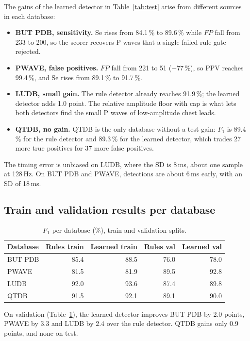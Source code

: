 \documentclass[11pt,a4paper]{article}
\begin{document}
The gains of the learned detector in Table~\ref{tab:test} arise from different sources in each database:
\begin{itemize}
\item \textbf{BUT PDB, sensitivity.} Se rises from 84.1\,\% to 89.6\,\% while $FP$ fall from 233 to 200, so the scorer recovers P waves that a single failed rule gate rejected.
\item \textbf{PWAVE, false positives.} $FP$ fall from 221 to 51 ($-77$\,\%), so PPV reaches 99.4\,\%, and Se rises from 89.1\,\% to 91.7\,\%.
\item \textbf{LUDB, small gain.} The rule detector already reaches 91.9\,\%; the learned detector adds 1.0 point. The relative amplitude floor with cap is what lets both detectors find the small P waves of low-amplitude chest leads.
\item \textbf{QTDB, no gain.} QTDB is the only database without a test gain: $F_1$ is 89.4\,\% for the rule detector and 89.3\,\% for the learned detector, which trades 27 more true positives for 37 more false positives.
\end{itemize}
The timing error is unbiased on LUDB, where the SD is 8\,ms, about one sample at 128\,Hz. On BUT PDB and PWAVE, detections are about 6\,ms early, with an SD of 18\,ms.

\subsection{Train and validation results per database}

\begin{table}[htbp]
\centering\small
\caption{$F_1$ per database (\%), train and validation splits.}
\label{tab:trainval}
\begin{tabular}{lrrrr}
\toprule
Database & Rules train & Learned train & Rules val & Learned val \\
\midrule
BUT PDB & 85.4 & 88.5 & 76.0 & 78.0 \\
PWAVE & 81.5 & 81.9 & 89.5 & 92.8 \\
LUDB & 92.0 & 93.6 & 87.4 & 89.8 \\
QTDB & 91.5 & 92.1 & 89.1 & 90.0 \\
\bottomrule
\end{tabular}
\end{table}

On validation (Table~\ref{tab:trainval}), the learned detector improves BUT PDB by 2.0 points, PWAVE by 3.3 and LUDB by 2.4 over the rule detector. QTDB gains only 0.9 points, and none on test.
\end{document}
